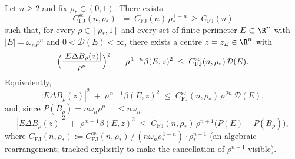 \begin{theorem}
\label{thm:FJ-scaled}
Let $n\ge 2$ and fix $\rho_*\in(0,1)$. There exists
\begin{equation}\label{eq:CFJsc}
   C_{\mathrm{FJ}}^{\mathrm{sc}}(n,\rho_*)
   \;:=\;C_{\mathrm{FJ}}(n)\,\rho_*^{\,1-n}\,\ge\,C_{\mathrm{FJ}}(n)
\end{equation}
such that, for every $\rho\in[\rho_*,1]$ and every set of finite
perimeter $E\subset\R^n$ with $|E|=\omega_n\rho^n$ and
$0<\mathcal D(E)<\infty$, there exists a centre $z=z_E\in\R^n$ with
\begin{equation}\label{eq:FJ-scaled}
   \Bigl(\frac{|E\Delta B_\rho(z)|}{\rho^n}\Bigr)^2
   \;+\;\rho^{\,1-n}\beta(E,z)^2
   \;\le\;C_{\mathrm{FJ}}^{\mathrm{sc}}(n,\rho_*)\,
   \mathcal D(E).
\end{equation}
Equivalently,
\begin{equation}\label{eq:FJ-scaled-quantities}
   |E\Delta B_\rho(z)|^2
   \;+\;\rho^{\,n+1}\beta(E,z)^2
   \;\le\;C_{\mathrm{FJ}}^{\mathrm{sc}}(n,\rho_*)\,\rho^{\,2n}\,
   \mathcal D(E),
\end{equation}
and, since $P(B_\rho)=n\omega_n\rho^{n-1}\le n\omega_n$,
\begin{equation}\label{eq:FJ-scaled-DP}
   |E\Delta B_\rho(z)|^2
   \;+\;\rho^{\,n+1}\beta(E,z)^2
   \;\le\;
   \widetilde C_{\mathrm{FJ}}(n,\rho_*)\,
   \rho^{n+1}\bigl(P(E)-P(B_\rho)\bigr),
\end{equation}
where $\widetilde C_{\mathrm{FJ}}(n,\rho_*)
:=C_{\mathrm{FJ}}^{\mathrm{sc}}(n,\rho_*)\,/\,
   (n\omega_n\rho_*^{\,1-n})\cdot \rho_*^{n-1}$
(an algebraic rearrangement; tracked explicitly to make the cancellation
of $\rho^{n+1}$ visible).
\end{theorem}

